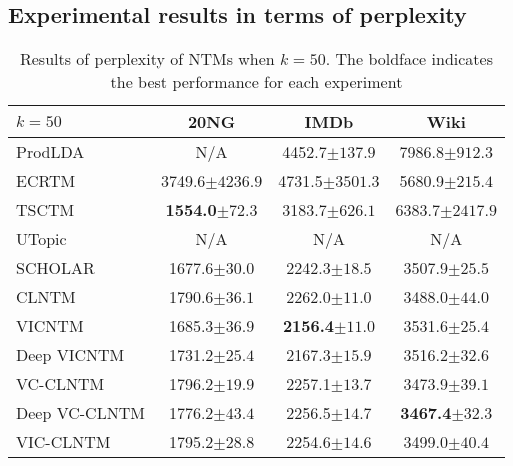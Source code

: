 \documentclass{article}
\begin{document}
\begin{appendices}
\section{Experimental results in terms of perplexity}\label{secA1}

\begin{table*}[ht]
    \centering
    \caption{Results of perplexity of NTMs when $k=50$. The boldface indicates the best performance for each experiment}
    \label{tab:perplexity50}
    \begin{tabular*}{\textwidth}{@{\extracolsep\fill}lccc}
        \hline
        $k=50$              & 20NG                   & IMDb                    & Wiki                    \\ \hline
        ProdLDA       & N/A                                & 4452.7{\tiny $\pm137.9$}           & 7986.8{\tiny $\pm912.3$}           \\
        ECRTM         & 3749.6{\tiny $\pm4236.9$}          & 4731.5{\tiny $\pm3501.3$}           & 5680.9{\tiny $\pm215.4$}           \\
        TSCTM         & {\bf 1554.0{\tiny $\pm72.3$}}          & 3183.7{\tiny $\pm626.1$}           & 6383.7{\tiny $\pm2417.9$}           \\
        UTopic        & N/A                              & N/A                               & N/A           \\
        SCHOLAR       & 1677.6{\tiny $\pm30.0$}          & 2242.3{\tiny $\pm18.5$}           & 3507.9{\tiny $\pm25.5$}           \\
        CLNTM         & 1790.6{\tiny $\pm36.1$}          & 2262.0{\tiny $\pm11.0$}           & 3488.0{\tiny $\pm44.0$}           \\ \hline
        VICNTM        & 1685.3{\tiny $\pm36.9$}          & {\bf 2156.4{\tiny $\pm11.0$}}           & 3531.6{\tiny $\pm25.4$} \\
        Deep VICNTM   & 1731.2{\tiny $\pm25.4$}          & 2167.3{\tiny $\pm15.9$}           & 3516.2{\tiny $\pm32.6$}  \\
        VC-CLNTM      & 1796.2{\tiny $\pm19.9$}          & 2257.1{\tiny $\pm13.7$}           & 3473.9{\tiny $\pm39.1$} \\
        Deep VC-CLNTM & 1776.2{\tiny $\pm43.4$}          & 2256.5{\tiny $\pm14.7$}           & {\bf 3467.4{\tiny $\pm32.3$}} \\
        VIC-CLNTM     & 1795.2{\tiny $\pm28.8$}          & 2254.6{\tiny $\pm14.6$}           & 3499.0{\tiny $\pm40.4$}           \\ \hline
        \end{tabular*}
    

\end{table*}
\end{appendices}
\end{document}
